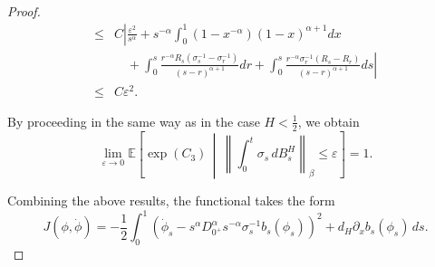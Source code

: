 \documentclass[10pt,a4paper]{amsart}
\begin{document}
\begin{proof}
\begin{align*}
     \leq & C\left| \frac{\varepsilon^2}{s^\alpha}+s^{-\alpha}\int_0^1 (1-x^{-\alpha})(1-x)^{\alpha+1}dx  \right. \\
     &\quad + \left.  \int_0^s \frac{r^{-\alpha} R_s(\sigma_s^{-1}-\sigma_r^{-1})}{(s-r)^{\alpha+1}}dr+\int_0^s \frac{r^{-\alpha}\sigma_r^{-1}(R_s-R_r)}{(s-r)^{\alpha+1}}ds   \right|\\
     \leq & C \varepsilon^2.
\end{align*}



By proceeding in the same way as in the case $H<\tfrac{1}{2}$, we obtain 
\[
\lim_{\varepsilon \to 0} \mathbb{E} \left[ \exp(C_3) \,\middle|\, \left\| \int_0^t \sigma_s\, dB^H_s \right\|_\beta \leq \varepsilon \right] = 1.
\]




Combining the above results, the functional takes the form  
\[
J(\phi,\dot{\phi}) = -\frac{1}{2} \int_0^1 \left(\dot{\phi}_s -s^{\alpha} D_{0^+}^\alpha s^{-\alpha} \sigma_s^{-1}  b_s(\phi_s)  \right)^2 +d_H\partial_x b_s(\phi_s)\, ds .
\]




\end{proof}
\end{document}
